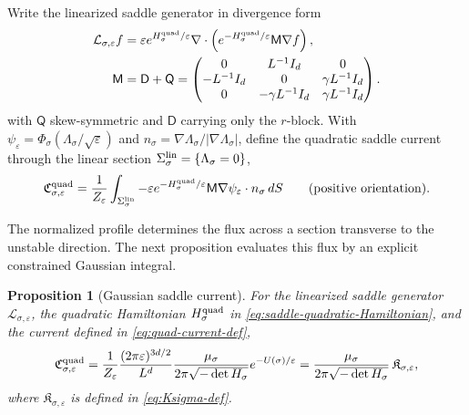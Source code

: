 \documentclass[11pt]{article}
\numberwithin{equation}{section}
\theoremstyle{plain}
\newtheorem{proposition}[theorem]{Proposition}
\theoremstyle{definition}
\theoremstyle{remark}
\newcommand{\eps}{\varepsilon}
\newcommand{\calL}{\mathcal L}
\begin{document}
Write the linearized saddle generator in divergence form
\begin{align*}
\calL_{\sigma,\eps}f
&=
\eps e^{H_\sigma^{\rm quad}/\eps}\nabla\cdot\left(e^{-H_\sigma^{\rm quad}/\eps}\mathsf M\nabla f\right),
\\
\mathsf M
&=\mathsf D+\mathsf Q
=\begin{pmatrix}
0&L^{-1}I_{d}&0\\
-L^{-1}I_{d}&0&\gamma L^{-1}I_{d}\\
0&-\gamma L^{-1}I_{d}&\gamma L^{-1}I_{d}
\end{pmatrix}.
\end{align*}
with $\mathsf Q$ skew-symmetric and $\mathsf D$ carrying only the $r$-block.
With $\psi_\eps=\Phi_\sigma(\Lambda_\sigma/\sqrt\eps)$ and
$n_\sigma=\nabla\Lambda_\sigma/|\nabla\Lambda_\sigma|$, define the quadratic
saddle current through the linear section
$\Sigma_\sigma^{\rm lin}=\{\Lambda_\sigma=0\}$,
\begin{equation}
\label{eq:quad-current-def}
\mathfrak C_{\sigma,\eps}^{\rm quad}
=
\frac{1}{Z_\eps}
\int_{\Sigma_\sigma^{\rm lin}}
-\eps e^{-H_\sigma^{\rm quad}/\eps}\mathsf M\nabla\psi_\eps\cdot n_\sigma\,dS
\qquad(\text{positive orientation}).
\end{equation}

The normalized profile determines the flux across a section
transverse to the unstable direction.  The next proposition evaluates this
flux by an explicit constrained Gaussian integral.

\begin{proposition}[Gaussian saddle current]
\label{prop:quadratic-gaussian-current}
For the linearized saddle generator $\calL_{\sigma,\eps}$, the quadratic
Hamiltonian $H_\sigma^{\rm quad}$ in
\eqref{eq:saddle-quadratic-Hamiltonian}, and the current defined in
\eqref{eq:quad-current-def},
\[
\mathfrak C_{\sigma,\eps}^{\rm quad}
=
\frac{1}{Z_\eps}
\frac{(2\pi\eps)^{3d/2}}{L^d}
\frac{\mu_\sigma}{2\pi\sqrt{-\det H_\sigma}}
e^{-U(\sigma)/\eps}
=\frac{\mu_\sigma}{2\pi\sqrt{-\det H_\sigma}}\,
\mathfrak K_{\sigma,\eps},
\]
where $\mathfrak K_{\sigma,\eps}$ is defined in \eqref{eq:Ksigma-def}.
\end{proposition}
\end{document}

